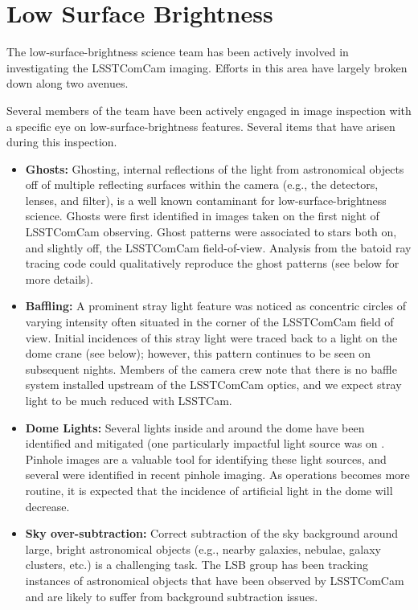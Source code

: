 \section{Low Surface Brightness}
\label{sec:low_surface_brightness}

The low-surface-brightness science team has been actively involved in investigating the LSSTComCam imaging. Efforts in this area have largely broken down along two avenues.

 Several members of the team have been actively engaged in image inspection with a specific eye on low-surface-brightness features. Several items that have arisen during this inspection. 

\begin{itemize}
\item {\bf Ghosts:} Ghosting, internal reflections of the light from astronomical objects off of multiple reflecting surfaces within the camera (e.g., the detectors, lenses, and filter), is a well known contaminant for low-surface-brightness science. Ghosts were first identified in images taken on the first night of LSSTComCam observing. Ghost patterns were associated to stars both on, and slightly off, the LSSTComCam field-of-view. Analysis from the batoid ray tracing code could qualitatively reproduce the ghost patterns (see below for more details).

\item {\bf Baffling:} A prominent stray light feature was noticed as concentric circles of varying intensity often situated in the corner of the LSSTComCam field of view. Initial incidences of this stray light were traced back to a light on the dome crane (see below); however, this pattern continues to be seen on subsequent nights.   Members of the camera crew note that there is no baffle system installed upstream of the LSSTComCam optics, and we expect stray light to be much reduced with LSSTCam.

\item {\bf Dome Lights:} Several lights inside and around the dome have been identified and mitigated (one particularly impactful light source was on . Pinhole images are a valuable tool for identifying these light sources, and several were identified in recent pinhole imaging. As operations becomes more routine, it is expected that the incidence of artificial light in the dome will decrease.

\item {\bf Sky over-subtraction:} Correct subtraction of the sky background around large, bright astronomical objects (e.g., nearby galaxies, nebulae, galaxy clusters, etc.) is a challenging task. The LSB group has been tracking instances of astronomical objects that have been observed by LSSTComCam and are likely to suffer from background subtraction issues.


\end{itemize}
